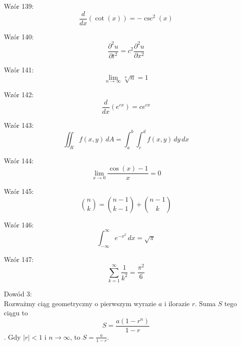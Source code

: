 \documentclass{article}
\begin{document}
Wzór 139:
\[ \frac{d}{dx}\left(\cot(x)\right) = -\csc^2(x) \]

Wzór 140:
\[ \frac{\partial^2u}{\partial t^2} = c^2 \frac{\partial^2u}{\partial x^2} \]

Wzór 141:
\[ \lim_{{n \to \infty}} \sqrt[n]{n} = 1 \]

Wzór 142:
\[ \frac{d}{dx}\left(e^{cx}\right) = c e^{cx} \]

Wzór 143:
\[ \iint_R f(x,y) \,dA = \int_{a}^{b} \int_{c}^{d} f(x,y) \,dy\,dx \]

Wzór 144:
\[ \lim_{{x \to 0}} \frac{\cos(x) - 1}{x} = 0 \]

Wzór 145:
\[ \binom{n}{k} = \binom{n-1}{k-1} + \binom{n-1}{k} \]

Wzór 146:
\[ \int_{-\infty}^{\infty} e^{-x^2} \,dx = \sqrt{\pi} \]

Wzór 147:
\[ \sum_{k=1}^{\infty} \frac{1}{k^2} = \frac{\pi^2}{6} \]

Dowód 3: \\
Rozważmy ciąg geometryczny o pierwszym wyrazie \( a \) i ilorazie \( r \). Suma \( S \) tego ciągu to
\[ S = \frac{a(1-r^n)}{1-r} \].
Gdy \( |r| < 1 \) i \( n \to \infty \), to \( S = \frac{a}{1-r} \).
\end{document}
